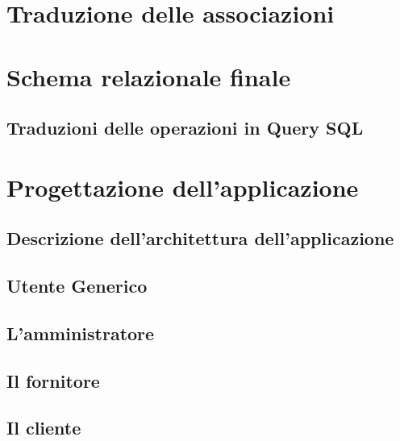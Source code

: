 \documentclass{article}
\begin{document}
\section{Traduzione delle associazioni}



\section{Schema relazionale finale} %


\subsection{Traduzioni delle operazioni in Query SQL}




\section{Progettazione dell'applicazione}
\subsection{Descrizione dell'architettura dell'applicazione}
 

\subsection{Utente Generico}


\subsection{L'amministratore}


\subsection{Il fornitore}


\subsection{Il cliente}

\end{document}
